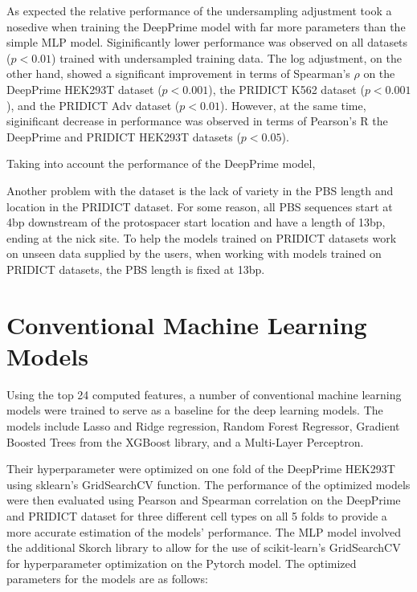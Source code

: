 As expected the relative performance of the undersampling adjustment took a nosedive when training the DeepPrime model with far more parameters than the simple MLP model. Siginificantly lower performance was observed on all datasets ($p<0.01$) trained with undersampled training data. The log adjustment, on the other hand, showed a significant improvement in terms of Spearman's $\rho$ on the DeepPrime HEK293T dataset ($p<0.001$), the PRIDICT K562 dataset ($p<0.001$), and the PRIDICT Adv dataset ($p<0.01$). However, at the same time, siginificant decrease in performance was observed in terms of Pearson's R the DeepPrime and PRIDICT HEK293T datasets ($p<0.05$). 

Taking into account the performance of the DeepPrime model, 

Another problem with the dataset is the lack of variety in the PBS length and location in the PRIDICT dataset. For some reason, all PBS sequences start at 4bp downstream of the protospacer start location and have a length of 13bp, ending at the nick site. To help the models trained on PRIDICT datasets work on unseen data supplied by the users, when working with models trained on PRIDICT datasets, the PBS length is fixed at 13bp. 


\section{Conventional Machine Learning Models}
\label{sec:conventional-ml}

Using the top 24 computed features, a number of conventional machine learning models were trained to serve as a baseline for the deep learning models. The models include Lasso and Ridge regression, Random Forest Regressor, Gradient Boosted Trees from the XGBoost library, and a Multi-Layer Perceptron.

Their hyperparameter were optimized on one fold of the DeepPrime HEK293T using sklearn's GridSearchCV function. The performance of the optimized models were then evaluated using Pearson and Spearman correlation on the DeepPrime and PRIDICT dataset for three different cell types on all 5 folds to provide a more accurate estimation of the models' performance. The MLP model involved the additional Skorch library to allow for the use of scikit-learn's GridSearchCV for hyperparameter optimization on the Pytorch model. The optimized parameters for the models are as follows:

